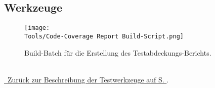 %



\clearpage





\subsection*{Werkzeuge}



\begin{figure}[ht]

	\centering
	\label{Abb:Werkzeuge:Coverage_Build_Batch}
	
	\texttt{[image: \\Tools/Code-Coverage Report Build-Script.png]}
	
	\caption{Build-Batch für die Erstellung des Testabdeckungs-Berichts.}

\end{figure}

~\\
{\hyperref[Abschnitt:Tests:Werkzeuge]{\mousecursor~Zurück zur Beschreibung der Testwerkzeuge auf S. \pageref{Abschnitt:Tests:Werkzeuge}}.}






